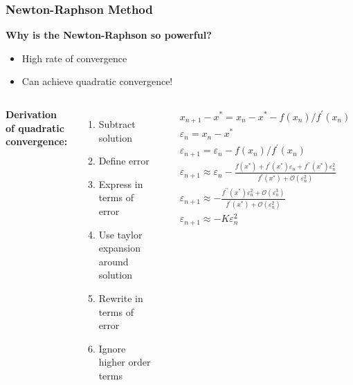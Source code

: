 \begin{frame}[fragile]
    \frametitle{Newton-Raphson Method}
    
    \textbf{Why is the Newton-Raphson so powerful?}
    \begin{itemize}
        \item High rate of convergence
        \item Can achieve quadratic convergence!
    \end{itemize}

    \begin{columns}
      \textbf{Derivation of quadratic convergence:}
      \begin{enumerate}
          \item Subtract solution
          \item Define error
          \item Express in terms of error
          \item Use taylor expansion around solution
          \item Rewrite in terms of error
          \item Ignore higher order terms
        \end{enumerate}
        \begin{align*}
          &x_{n+1} - x^*     = x_n - x^* - f(x_n)/f^\prime(x_n) \\
        &\varepsilon_n    = x_n - x^*  \\
        &\varepsilon_{n+1} = \varepsilon_n - f(x_n)/f^\prime(x_n)  \\
        &\varepsilon_{n+1} \approx \varepsilon_n - \frac{f(x^*)+f^{\prime}(x^*)\varepsilon_n+f^{\prime\prime}(x^*)\varepsilon_n ^2}{f^\prime(x^*)+\mathcal{O}(\varepsilon_n ^2)}\\
        &\varepsilon_{n+1} \approx -\frac{f^{\prime\prime}(x^*)\varepsilon_n ^2 + \mathcal{O}(\varepsilon_n ^3)}{f^\prime(x^*)+\mathcal{O}(\varepsilon_n ^2)}\\
        &\boxed{\varepsilon_{n+1} \approx -K\varepsilon_n ^2}
        \end{align*}
      \end{columns}
\end{frame}

    
